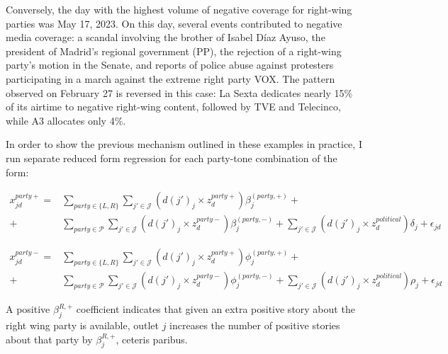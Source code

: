 \documentclass[12pt]{article}
\begin{document}
Conversely, the day with the highest volume of negative coverage for right-wing parties was May 17, 2023. On this day, several events contributed to negative media coverage: a scandal involving the brother of Isabel Díaz Ayuso, the president of Madrid’s regional government (PP), the rejection of a right-wing party’s motion in the Senate, and reports of police abuse against protesters participating in a march against the extreme right party VOX. The pattern observed on February 27 is reversed in this case: La Sexta dedicates nearly 15\% of its airtime to negative right-wing content, followed by TVE and Telecinco, while A3 allocates only 4\%.
	
	
	
	In order to show the previous mechanism outlined in these examples in practice, I run separate reduced form regression for each party-tone combination of the form: 
	
	

	
	\begin{equation}\label{eq:pred_pos}
	\begin{aligned}
x^{party+}_{jd}=& \sum_{party \in \{L,R\}} \sum_{j' \in \mathcal{J} }  \left(d(j')_j \times z^{party+} _d      \right) \beta_{j}^{(party,+ )}  + \\
		+ &   \sum_{party \in \mathcal{P}} \sum_{j' \in \mathcal{J} }   \left(d(j')_j \times z^{party-} _d      \right) \beta_{j}^{(party,- )} +    \sum_{j' \in \mathcal{J} }   \left(d(j')_j \times z^{political}_d      \right) \delta_{j} +\epsilon_{jd}
	\end{aligned}	
\end{equation} 



\begin{equation}\label{eq:pred_neg}
	\begin{aligned}
	x^{party-}_{jd}=& \sum_{party \in \{L,R\}} \sum_{j' \in \mathcal{J} }  \left(d(j')_j \times z^{party+} _d      \right) \phi_{j}^{(party,+ )}  + \\
		+ &   \sum_{party \in \mathcal{P}} \sum_{j' \in \mathcal{J} }   \left(d(j')_j \times z^{party-} _d      \right) \phi_{j}^{(party,- )} +    \sum_{j' \in \mathcal{J} }   \left(d(j')_j \times z^{political}_d      \right) \rho_{j} +\epsilon_{jd}
	\end{aligned}
\end{equation} 
	
	
	A positive $ \beta_{j}^{R,+} $ coefficient indicates that given an extra positive story about the right wing party is available, outlet $ j $ increases the number of positive stories about that party by $  \beta_{j}^{R,+}  $, ceteris paribus. 
	
\end{document}
